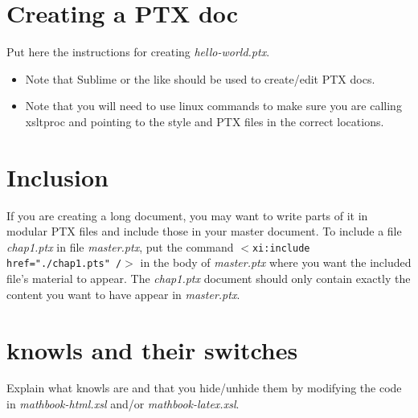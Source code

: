 \section{Creating a PTX doc}
Put here the instructions for creating \textit{hello-world.ptx}.

\begin{itemize}
\item
Note that Sublime or the like should be used to create/edit PTX docs.
\item Note that you will need to use linux commands to make sure you are calling xsltproc and pointing to the style and PTX files in the correct locations.
\end{itemize}


\section{Inclusion}\label{inc}

If you are creating a long document, you may want to write parts of it in modular PTX files and include those in your master document. To include a file \textit{chap1.ptx} in file \textit{master.ptx}, put the command
\texttt{$<$xi:include href="./chap1.pts" /$>$}
in the body of \textit{master.ptx} where you want the included file's material to appear. The \textit{chap1.ptx} document should only contain exactly the content you want to have appear in \textit{master.ptx}.

\section{knowls and their switches}
Explain what knowls are and that you  hide/unhide them by modifying the code in \textit{mathbook-html.xsl}  and/or\textit{ mathbook-latex.xsl}.
